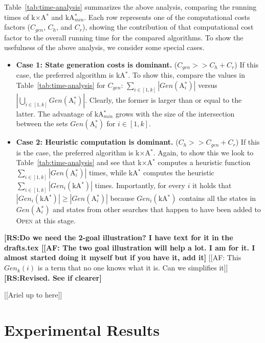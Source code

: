 \documentclass{aicom2e}
\newcommand{\kgs}{$k$GP}
\newcommand{\astar}{A$^*$}
\newcommand{\kastar}{kA$^*$}
\newcommand{\kastarmin}{kA$^*_{min}$}
\newcommand{\kastarmax}{kA$^*_{max}$}
\newcommand{\kxastar}{k$\times$A$^*$}
\newcommand{\astari}[1]{A$^*_#1$}
\newcommand{\minf}{$F_{min}(n)$}
\newcommand{\open}{\textsc{Open}}
\newcommand{\roni}[1]{\textbf{[RS:#1]}}
\begin{document}
Table~\ref{tab:time-analysis} summarizes the above analysis, comparing the
running times of \kxastar{} and \kastarmin{}. Each row represents one of the
computational costs factors ($C_{gen}$, $C_{h}$, and $C_{r}$),
showing the contribution of that computational cost factor to the overall
running time for the compared algorithms. To show the usefulness of the above
analysis, we consider some special cases.
\begin{itemize}
    \item {\bf Case 1: State generation costs is dominant.} ($C_{gen}>>C_{h}+C_r$)
    If this case, the preferred algorithm is \kastar{}. To show this,
    compare the values in Table~\ref{tab:time-analysis} for $C_{gen}$: $\sum_{i\in[1,k]} |Gen(\text{\astari{i}})|$
    versus $|\bigcup_{i\in[1,k]} Gen(\text{\astari{i}})|$. Clearly, the former is larger than or equal to the latter.
    The advantage of \kastarmin{} grows with the size of the intersection between the sets $Gen(\text{\astari{i}})$ for $i\in[1,k]$.

    \item {\bf Case 2: Heuristic computation is dominant.} ($C_{h}>>C_{gen}+C_r$)
    If this is the case, the preferred algorithm is \kxastar{}. Again, to show this we look to Table~\ref{tab:time-analysis} and see that \kxastar{} computes a heuristic function
    $\sum_{i\in[1,k]} |Gen(\text{\astari{i}})|$ times, while
    \kastar{} computes the heuristic $\sum_{i\in[1,k]} |Gen_i(\text{\kastar})|$ times.
    Importantly, for every $i$ it holds that $|Gen_i(\text{\kastar})|\geq |Gen(\text{\astari{i}})|$
    because $Gen_i(\text{\kastar})$ contains all the states in $Gen(\text{\astari{i}})$
    and states from other searches that happen to have been added to \open{} at this stage.
\end{itemize}

\roni{Do we need the 2-goal illustration? I have text for it in the drafts.tex
[[AF: The two goal illustration will help a lot. I am for it. I almost started
doing it myself but if you have it, add it}
[[AF: This  $Gen_k(i)$ is a term that no one knows what it is. Can we
simplifies it]]
\roni{Revised. See if clearer}

[[Ariel up to here]]

\section{Experimental Results}

\end{document}
